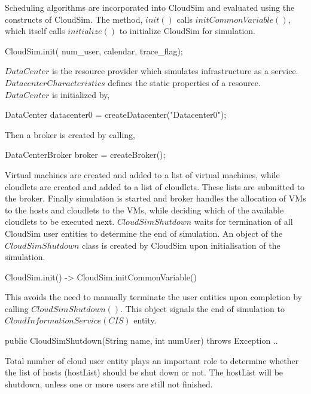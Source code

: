\documentclass[times, 10pt,twocolumn]{article}
\begin{document}
Scheduling algorithms are incorporated into CloudSim and evaluated using the constructs of CloudSim. The method, $init()$ calls $initCommonVariable()$, which itself calls $initialize()$ to initialize CloudSim for simulation.
\begin{verbatimtab}
CloudSim.init(
    num_user, calendar, trace_flag);
\end{verbatimtab}
$DataCenter$ is the resource provider which simulates infrastructure as a service. $DatacenterCharacteristics$ defines the static properties of a resource. $DataCenter$ is initialized by,
\begin{verbatimtab}
DataCenter datacenter0 = 
    createDatacenter("Datacenter0");
\end{verbatimtab}
Then a broker is created by calling,
\begin{verbatimtab}
DataCenterBroker broker = createBroker();
\end{verbatimtab}
Virtual machines are created and added to a list of virtual machines, while cloudlets are created and added to a list of cloudlets. These lists are submitted to the broker. Finally simulation is started and broker handles the allocation of VMs to the hosts and cloudlets to the VMs, while deciding which of the available cloudlets to be executed next. $CloudSimShutdown$ waits for termination of all CloudSim user entities to determine the end of simulation. An object of the $CloudSimShutdown$ class is created by CloudSim upon initialisation of the simulation.
\begin{verbatimtab}
CloudSim.init() -> 
    CloudSim.initCommonVariable()
\end{verbatimtab}
This avoids the need to manually terminate the user entities upon completion by calling $CloudSimShutdown()$. This object signals the end of simulation to $CloudInformationService (CIS)$ entity.
\begin{verbatimtab}
public CloudSimShutdown(String name,
    int numUser) throws Exception { .. }
\end{verbatimtab}
Total number of cloud user entity plays an important role to determine whether the list of hosts (hostList) should be shut down or not. The hostList will be shutdown, unless one or more users are still not finished.
\end{document}
